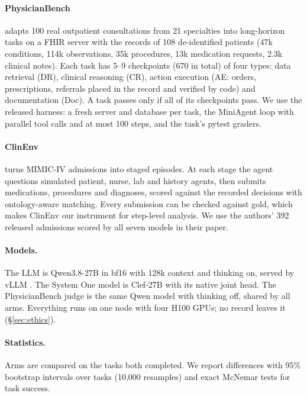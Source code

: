 \documentclass[11pt]{article}
\begin{document}
\paragraph{PhysicianBench} \citep{physicianbench2026} adapts 100 real outpatient consultations from 21 specialties
into long-horizon tasks on a FHIR server with the records of 108 de-identified patients (47k conditions, 114k
observations, 35k procedures, 13k medication requests, 2.3k clinical notes). Each task has 5--9 checkpoints (670 in
total) of four types: data retrieval (DR), clinical reasoning (CR), action execution (AE: orders, prescriptions,
referrals placed in the record and verified by code) and documentation (Doc). A task passes only if all of its
checkpoints pass. We use the released harness: a fresh server and database per task, the MiniAgent loop with parallel
tool calls and at most 100 steps, and the task's pytest graders.

\paragraph{ClinEnv} \citep{clinenv2026} turns MIMIC-IV admissions \citep{johnson2023mimiciv} into staged episodes. At
each stage the agent questions simulated patient, nurse, lab and history agents, then submits medications, procedures
and diagnoses, scored against the recorded decisions with ontology-aware matching. Every submission can be checked
against gold, which makes ClinEnv our instrument for step-level analysis. We use the authors' 392 released admissions
scored by all seven models in their paper.

\paragraph{Models.} The LLM is Qwen3.8-27B \citep{qwen38} in bf16 with 128k context and thinking on, served by vLLM
\citep{kwon2023vllm}. The System One model is Clef-27B \citep{clef2026} with its native joint head. The PhysicianBench
judge is the same Qwen model with thinking off, shared by all arms. Everything runs on one node with four H100 GPUs;
no record leaves it (\S\ref{sec:ethics}).

\paragraph{Statistics.} Arms are compared on the tasks both completed. We report differences with 95\% bootstrap
intervals over tasks (10,000 resamples) and exact McNemar tests for task success.
\end{document}
